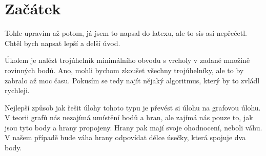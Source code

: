 \section{Začátek}
\label{sec:zacatek}

\textcolor{myred}{Tohle upravím až potom, já jsem to napsal do latexu, ale to sis asi nepřečetl. Chtěl bych napsat lepší a delší úvod.}

Úkolem je nalézt trojúhelník minimálního obvodu s vrcholy v zadané množině rovinných bodů. Ano, mohli bychom zkoušet všechny trojúhelníky, ale to by zabralo až moc času. Pokusím se tedy najít nějaký algoritmus, který by to zvládl rychleji.

Nejlepší způsob jak řešit úlohy tohoto typu je převést si úlohu na grafovou úlohu. V teorii grafů nás nezajímá umístění bodů a hran, ale zajímá nás pouze to, jak jsou tyto body a hrany propojeny. Hrany pak mají svoje ohodnocení, neboli váhu. V našem případě bude váha hrany odpovídat délce úsečky, která spojuje dva body.